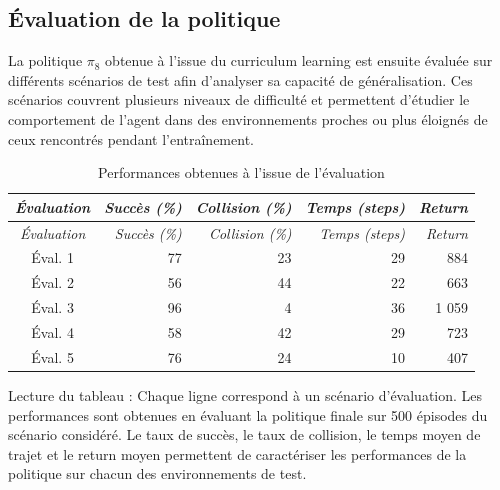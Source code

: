 

\subsection{Évaluation de la politique}

\noindent La politique $\pi_8$ obtenue à l'issue du curriculum learning est ensuite évaluée sur différents scénarios de test afin d'analyser sa capacité de généralisation. Ces scénarios couvrent plusieurs niveaux de difficulté et permettent d'étudier le comportement de l'agent dans des environnements proches ou plus éloignés de ceux rencontrés pendant l'entraînement.

\begin{longtable}{crrrr}

\caption{Performances obtenues à l'issue de l'évaluation} \label{tab:eval_perf} \\
\toprule
\textit{Évaluation} & \textit{Succès (\%)} & \textit{Collision (\%)} & \textit{Temps (steps)} & \textit{Return} \\
\midrule
\endfirsthead
\toprule
\textit{Évaluation}  & \textit{Succès (\%)} & \textit{Collision (\%)} & \textit{Temps (steps)} & \textit{Return} \\
\midrule
\endhead
\midrule
\endfoot
\bottomrule
\endlastfoot

Éval. 1 & 77 & 23 & 29 & 884 \\
\midrule
Éval. 2 & 56 & 44 & 22 & 663 \\
\midrule
Éval. 3 & 96 & 4 & 36 & 1 059 \\
\midrule
Éval. 4 & 58 & 42 & 29 & 723 \\
\midrule
Éval. 5 & 76 & 24 & 10 & 407 \\

\end{longtable}
\vspace{-10pt}
{
\footnotesize
\color{darkgray}
\noindent Lecture du tableau : Chaque ligne correspond à un scénario d'évaluation. Les performances sont obtenues en évaluant la politique finale sur 500 épisodes du scénario considéré. Le taux de succès, le taux de collision, le temps moyen de trajet et le return moyen permettent de caractériser les performances de la politique sur chacun des environnements de test.
}

